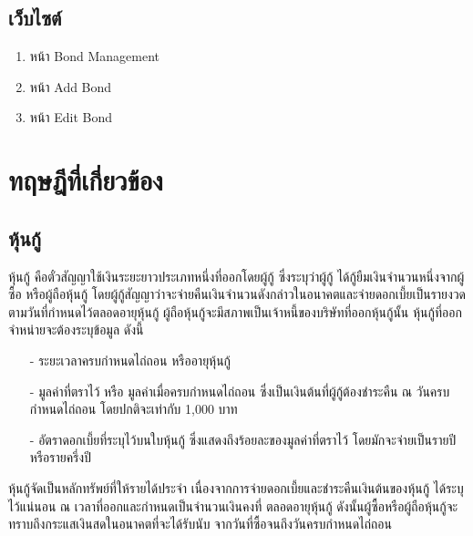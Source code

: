     \subsection{เว็บไซต์}
        \begin{enumerate}
            \item หน้า Bond Management
            \item หน้า Add Bond
            \item หน้า Edit Bond
        \end{enumerate}

\section{ทฤษฎีที่เกี่ยวข้อง}
    \subsection{หุ้นกู้}
        หุ้นกู้ คือตั๋วสัญญาใช้เงินระยะยาวประเภทหนึ่งที่ออกโดยผู้กู้ ซึ่งระบุว่าผู้กู้ ได้กู้ยืมเงินจำนวนหนึ่งจากผู้ซื้อ หรือผู้ถือหุ้นกู้ โดยผู้กู้สัญญาว่าจะจ่ายคืนเงินจำนวนดังกล่าวในอนาคตและจ่ายดอกเบี้ยเป็นรายงวดตามวันที่กำหนดไว้ตลอดอายุหุ้นกู้ ผู้ถือหุ้นกู้จะมีสภาพเป็นเจ้าหนี้ของบริษัทที่ออกหุ้นกู้นั้น
        หุ้นกู้ที่ออกจำหน่ายจะต้องระบุข้อมูล ดังนี้
        \begin{itemize}
            \item[-] ระยะเวลาครบกำหนดไถ่ถอน หรืออายุหุ้นกู้
            \item[-] มูลค่าที่ตราไว้ หรือ มูลค่าเมื่อครบกำหนดไถ่ถอน ซึ่งเป็นเงินต้นที่ผู้กู้ต้องชำระคืน ณ วันครบกำหนดไถ่ถอน โดยปกติจะเท่ากับ 1,000 บาท
            \item[-] อัตราดอกเบี้ยที่ระบุไว้บนใบหุ้นกู้ ซึ่งแสดงถึงร้อยละของมูลค่าที่ตราไว้ โดยมักจะจ่ายเป็นรายปีหรือรายครึ่งปี
        \end{itemize}
        หุ้นกู้จัดเป็นหลักทรัพย์ที่ให้รายได้ประจำ เนื่องจากการจ่ายดอกเบี้ยและชำระคืนเงินต้นของหุ้นกู้ ได้ระบุไว้แน่นอน ณ เวลาที่ออกและกำหนดเป็นจำนวนเงินคงที่ ตลอดอายุหุ้นกู้ ดังนั้นผู้ซื้อหรือผู้ถือหุ้นกู้จะทราบถึงกระแสเงินสดในอนาคตที่จะได้รับนับ จากวันที่ซื้อจนถึงวันครบกำหนดไถ่ถอน\cite{bond}

